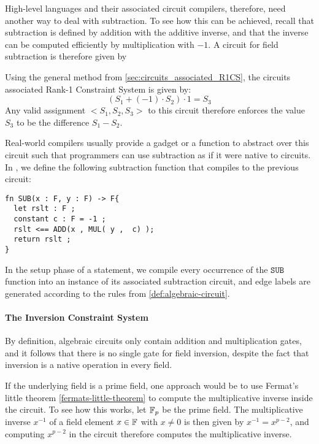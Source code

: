 High-level languages and their associated circuit compilers, therefore, need another way to deal with subtraction. To see how this can be achieved, recall that subtraction is defined by addition with the additive inverse, and that the inverse can be computed efficiently by multiplication with $-1$. A circuit for field subtraction is therefore given by
\begin{center}
\end{center}
Using the general method from \ref{sec:circuits_associated_R1CS}, the circuits associated Rank-1 Constraint System is given by:
\begin{equation}
\left(S_1 + (-1)\cdot S_2\right)\cdot 1 = S_3
\end{equation}
Any valid assignment $<S_1,S_2, S_3>$ to this circuit therefore enforces the value $S_3$ to be the difference $S_1- S_2$.

Real-world compilers usually provide a gadget or a function to abstract over this circuit such that programmers can use subtraction as if it were native to circuits.
In , we define the following subtraction function that compiles to the previous circuit:
\begin{lstlisting}
fn SUB(x : F, y : F) -> F{
  let rslt : F ;
  constant c : F = -1 ;
  rslt <== ADD(x , MUL( y ,  c) );
  return rslt ;
}
\end{lstlisting}
In the setup phase of a statement, we compile every occurrence of the $\mathtt{SUB}$ function into an instance of its associated subtraction circuit, and edge labels are generated according to the rules from \ref{def:algebraic-circuit}.
\paragraph{The Inversion Constraint System} By definition, algebraic circuits only contain addition and multiplication gates, and it follows that there is no single gate for field inversion, despite the fact that inversion is a native operation in every field. 

If the underlying field is a prime field, one approach would be to use Fermat's little theorem \ref{fermats-little-theorem} to compute the multiplicative inverse inside the circuit. To see how this works, let $\mathbb{F}_p$ be the prime field. The multiplicative inverse $x^{-1}$ of a field element $x\in\mathbb{F}$ with $x\neq 0$ is then given by $x^{-1}= x^{p-2}$, and computing $x^{p-2}$ in the circuit therefore computes the multiplicative inverse. 

